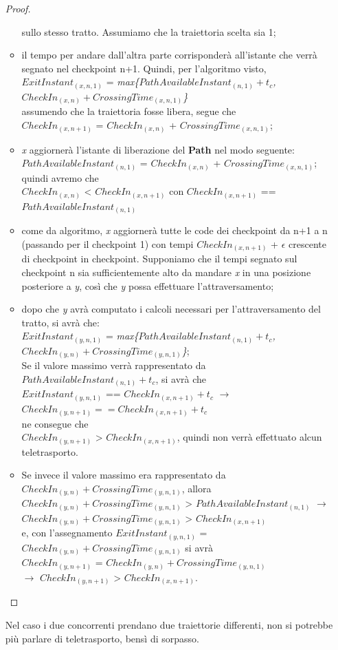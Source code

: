 \begin{itemize}
\begin{proof}
\begin{itemize}
sullo stesso tratto. Assumiamo che la traiettoria scelta sia 1;
\item il tempo per andare dall'altra parte corrisponderà all'istante che verrà segnato nel checkpoint 
n+1. Quindi, per l'algoritmo visto, \\
$ExitInstant_{(x,n,1)}$ = \emph{max\{$PathAvailableInstant_{(n,1)}+t_c$,$CheckIn_{(x,n)}+CrossingTime_{(x,n,1)}$\}}\\
assumendo che la traiettoria fosse libera, segue che\\
$CheckIn_{(x,n+1)}$ = $CheckIn_{(x,n)}$ + $CrossingTime_{(x,n,1)}$;
\item \emph{x} aggiornerà l'istante di liberazione del \textbf{Path} nel modo seguente:
$PathAvailableInstant_{(n,1)}$ = $CheckIn_{(x,n)}$ + $CrossingTime_{(x,n,1)}$;\\
quindi avremo che\\
$CheckIn_{(x,n)}$ < $CheckIn_{(x,n+1)}$ con $CheckIn_{(x,n+1)}$ == $PathAvailableInstant_{(n,1)}$
\item come da algoritmo, \emph{x} aggiornerà tutte le code dei checkpoint da n+1 a n (passando per il checkpoint 1) con tempi $CheckIn_{(x,n+1)}$ + $\epsilon$ 
crescente di checkpoint in checkpoint. Supponiamo che il tempi segnato sul checkpoint n sia sufficientemente alto da mandare \emph{x}
in una posizione posteriore a \emph{y}, così che \emph{y} possa effettuare l'attraversamento;
\item dopo che \emph{y} avrà computato i calcoli necessari per l'attraversamento del tratto, si avrà che:\\
$ExitInstant_{(y,n,1)}$ = \emph{max\{$PathAvailableInstant_{(n,1)}+t_c$,$CheckIn_{(y,n)}+CrossingTime_{(y,n,1)}$\}};\\
Se il valore massimo verrà rappresentato da $PathAvailableInstant_{(n,1)}+t_c$, si avrà che \\
$ExitInstant_{(y,n,1)}$ == $CheckIn_{(x,n+1)}+t_c$ $\rightarrow$ $CheckIn_{(y,n+1)}==CheckIn_{(x,n+1)}+t_c$\\
ne consegue che\\
$CheckIn_{(y,n+1)}$ > $CheckIn_{(x,n+1)}$, quindi non verrà effettuato alcun teletrasporto.
\item Se invece il valore massimo era rappresentato da\\ 
$CheckIn_{(y,n)}+CrossingTime_{(y,n,1)}$, allora\\ 
$CheckIn_{(y,n)}+CrossingTime_{(y,n,1)}$ > $PathAvailableInstant_{(n,1)}$ $\rightarrow$\\ 
$CheckIn_{(y,n)}+CrossingTime_{(y,n,1)}$ > $CheckIn_{(x,n+1)}$ \\
e, con l'assegnamento
$ExitInstant_{(y,n,1)}$ = $CheckIn_{(y,n)}+CrossingTime_{(y,n,1)}$ si avrà \\
$CheckIn_{(y,n+1)}$ = $CheckIn_{(y,n)}+CrossingTime_{(y,n,1)}$\\
$\rightarrow$ $CheckIn_{(y,n+1)}$ > $CheckIn_{(x,n+1)}$.
\end{itemize}
\end{proof}
Nel caso i due concorrenti prendano due traiettorie differenti, non si potrebbe più parlare di teletrasporto, bensì di sorpasso.
\end{itemize}
